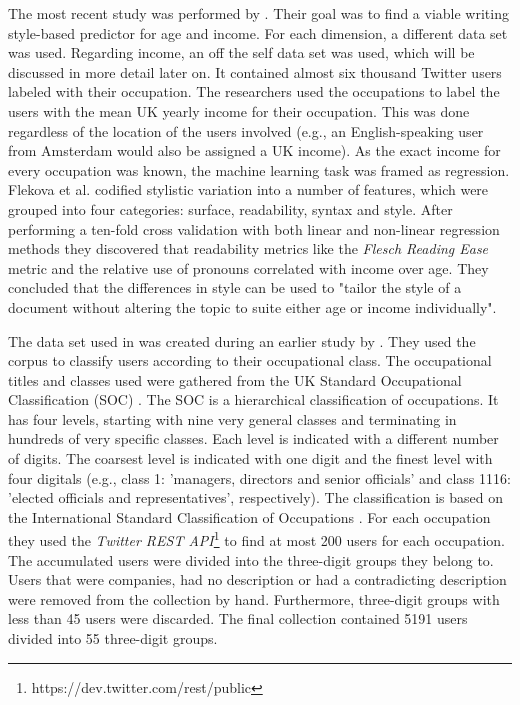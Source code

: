 \documentclass[
10pt, %
a4paper, %
oneside, %
headinclude,footinclude, %
] {book}%
\begin{document}
The most recent study was performed by \citet{flekova}. Their goal was to find a viable writing style-based predictor for age and income. For each dimension, a different data set was used. 
Regarding income, an off the self data set was used, which will be discussed in more detail later on. It contained almost six thousand Twitter users labeled with their occupation. The researchers used the occupations to label the users with the mean UK yearly income for their occupation. This was done regardless of the location of the users involved (e.g., an English-speaking user from Amsterdam would also be assigned a UK income). 
As the exact income for every occupation was known, the machine learning task was framed as regression. Flekova et al. codified stylistic variation into a number of features, which were grouped into four categories: surface, readability, syntax and style. 
After performing a ten-fold cross validation with both linear and non-linear regression methods they discovered that readability metrics like the \textit{Flesch Reading Ease} metric and the relative use of pronouns correlated with income over age. They concluded that the differences in style can be used to "tailor the style of a document without altering the topic to suite either age or income individually".

The data set used in \citet{flekova} was created during an earlier study by \citet{pietro}. They used the corpus to classify users according to their occupational class. 
The occupational titles and classes used were gathered from the UK Standard Occupational Classification (SOC) \citep{uksoc}. The SOC is a hierarchical classification of occupations. It has four levels, starting with nine very general classes and terminating in hundreds of very specific classes. Each level is indicated with a different number of digits. The coarsest level is indicated with one digit and the finest level with four digitals (e.g., class 1: 'managers, directors and senior officials' and class 1116: 'elected officials and representatives', respectively). The classification is based on the International Standard Classification of Occupations \citep{isco}.
For each occupation they used the \textit{Twitter REST API}\footnote{https://dev.twitter.com/rest/public} to find at most 200 users for each occupation. The accumulated users were divided into the three-digit groups they belong to. Users that were companies, had no description or had a contradicting description were removed from the collection by hand. Furthermore, three-digit groups with less than 45 users were discarded. The final collection contained 5191 users divided into 55 three-digit groups.
\end{document}
